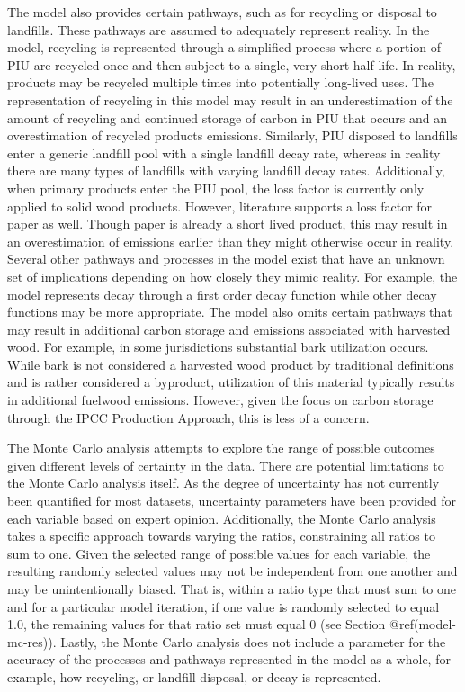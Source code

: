 \documentclass[
  openany]{book}
\begin{document}
The model also provides certain pathways, such as for recycling or
disposal to landfills. These pathways are assumed to adequately
represent reality. In the model, recycling is represented through a
simplified process where a portion of PIU are recycled once and then
subject to a single, very short half-life. In reality, products may be
recycled multiple times into potentially long-lived uses. The
representation of recycling in this model may result in an
underestimation of the amount of recycling and continued storage of
carbon in PIU that occurs and an overestimation of recycled products
emissions. Similarly, PIU disposed to landfills enter a generic landfill
pool with a single landfill decay rate, whereas in reality there are
many types of landfills with varying landfill decay rates. Additionally,
when primary products enter the PIU pool, the loss factor is currently
only applied to solid wood products. However, literature supports a loss
factor for paper as well. Though paper is already a short lived product,
this may result in an overestimation of emissions earlier than they
might otherwise occur in reality. Several other pathways and processes
in the model exist that have an unknown set of implications depending on
how closely they mimic reality. For example, the model represents decay
through a first order decay function while other decay functions may be
more appropriate. The model also omits certain pathways that may result
in additional carbon storage and emissions associated with harvested
wood. For example, in some jurisdictions substantial bark utilization
occurs. While bark is not considered a harvested wood product by
traditional definitions and is rather considered a byproduct,
utilization of this material typically results in additional fuelwood
emissions. However, given the focus on carbon storage through the IPCC
Production Approach, this is less of a concern.

The Monte Carlo analysis attempts to explore the range of possible
outcomes given different levels of certainty in the data. There are
potential limitations to the Monte Carlo analysis itself. As the degree
of uncertainty has not currently been quantified for most datasets,
uncertainty parameters have been provided for each variable based on
expert opinion. Additionally, the Monte Carlo analysis takes a specific
approach towards varying the ratios, constraining all ratios to sum to
one. Given the selected range of possible values for each variable, the
resulting randomly selected values may not be independent from one
another and may be unintentionally biased. That is, within a ratio type
that must sum to one and for a particular model iteration, if one value
is randomly selected to equal 1.0, the remaining values for that ratio
set must equal 0 (see Section @ref(model-mc-res)). Lastly, the Monte
Carlo analysis does not include a parameter for the accuracy of the
processes and pathways represented in the model as a whole, for example,
how recycling, or landfill disposal, or decay is represented.
\end{document}
